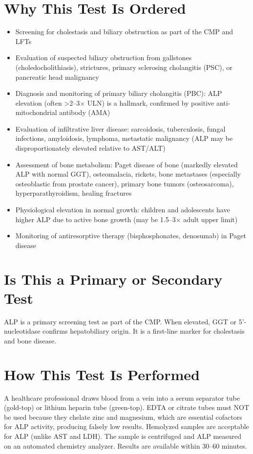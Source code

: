 \section*{Why This Test Is Ordered}
\begin{itemize}
  \item Screening for cholestasis and biliary obstruction as part of the CMP and LFTs
  \item Evaluation of suspected biliary obstruction from gallstones (choledocholithiasis), strictures, primary sclerosing cholangitis (PSC), or pancreatic head malignancy
  \item Diagnosis and monitoring of primary biliary cholangitis (PBC): ALP elevation (often >2--3$\times$ ULN) is a hallmark, confirmed by positive anti-mitochondrial antibody (AMA)
  \item Evaluation of infiltrative liver disease: sarcoidosis, tuberculosis, fungal infections, amyloidosis, lymphoma, metastatic malignancy (ALP may be disproportionately elevated relative to AST/ALT)
  \item Assessment of bone metabolism: Paget disease of bone (markedly elevated ALP with normal GGT), osteomalacia, rickets, bone metastases (especially osteoblastic from prostate cancer), primary bone tumors (osteosarcoma), hyperparathyroidism, healing fractures
  \item Physiological elevation in normal growth: children and adolescents have higher ALP due to active bone growth (may be 1.5--3$\times$ adult upper limit)
  \item Monitoring of antiresorptive therapy (bisphosphonates, denosumab) in Paget disease
\end{itemize}

\section*{Is This a Primary or Secondary Test}
ALP is a primary screening test as part of the CMP. When elevated, GGT or 5'-nucleotidase confirms hepatobiliary origin. It is a first-line marker for cholestasis and bone disease.

\section*{How This Test Is Performed}
A healthcare professional draws blood from a vein into a serum separator tube (gold-top) or lithium heparin tube (green-top). EDTA or citrate tubes must NOT be used because they chelate zinc and magnesium, which are essential cofactors for ALP activity, producing falsely low results. Hemolyzed samples are acceptable for ALP (unlike AST and LDH). The sample is centrifuged and ALP measured on an automated chemistry analyzer. Results are available within 30--60 minutes.


